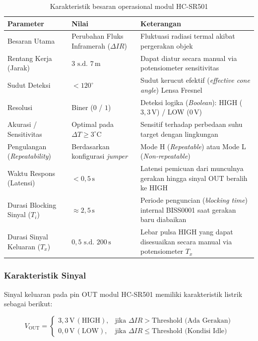 \begin{table}[H]
    \centering
    \caption{Karakteristik besaran operasional modul HC-SR501}
    \label{tab:hc_sr501_karakteristik_besaran}
    \small
    \begin{tabularx}{\textwidth}{@{} p{3.8cm} >{\hsize=0.7\hsize}X >{\hsize=1.3\hsize}X @{}}
        \toprule
        Parameter & Nilai & Keterangan \\
        \midrule
        Besaran Utama & Perubahan Fluks Inframerah ($\Delta IR$) & Fluktuasi radiasi termal akibat pergerakan objek \\
        Rentang Kerja (Jarak) & $3\text{ s.d. }7\,\text{m}$ & Dapat diatur secara manual via potensiometer sensitivitas \\
        Sudut Deteksi & $< 120^\circ$ & Sudut kerucut efektif (\textit{effective cone angle}) Lensa Fresnel \\
        Resolusi & Biner ($0$ / $1$) & Deteksi logika (\textit{Boolean}): HIGH ($3{,}3\,\text{V}$) / LOW ($0\,\text{V}$) \\
        Akurasi / Sensitivitas & Optimal pada $\Delta T \ge 3^\circ\text{C}$ & Sensitif terhadap perbedaan suhu target dengan lingkungan \\
        Pengulangan (\textit{Repeatability}) & Berdasarkan konfigurasi \textit{jumper} & Mode H (\textit{Repeatable}) atau Mode L (\textit{Non-repeatable}) \\
        Waktu Respons (Latensi) & $< 0{,}5\,\text{s}$ & Latensi pemicuan dari munculnya gerakan hingga sinyal OUT beralih ke HIGH \\
        Durasi Blocking Sinyal ($T_i$) & $\approx 2{,}5\,\text{s}$ & Periode penguncian (\textit{blocking time}) internal BISS0001 saat gerakan baru diabaikan \\
        Durasi Sinyal Keluaran ($T_x$) & $0{,}5\text{ s.d. }200\,\text{s}$ & Lebar pulsa HIGH yang dapat disesuaikan secara manual via potensiometer $T_x$ \\
        \bottomrule
    \end{tabularx}
\end{table}
\subsubsection{Karakteristik Sinyal}
Sinyal keluaran pada pin OUT modul HC-SR501 memiliki karakteristik listrik sebagai berikut:

\begin{equation}
	V_{\text{OUT}} =
	\begin{cases}
		3{,}3\,\text{V} \, (\text{HIGH}), & \text{jika } \Delta IR > \text{Threshold (Ada Gerakan)}    \\
		0{,}0\,\text{V} \, (\text{LOW}),  & \text{jika } \Delta IR \le \text{Threshold (Kondisi Idle)}
	\end{cases}
	\label{eq:hc_sr501_packet}
\end{equation}

